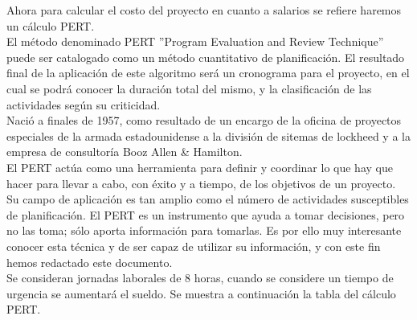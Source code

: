 \documentclass[12pt]{report}
\begin{document}
Ahora para calcular el costo del proyecto en cuanto a salarios se refiere haremos un cálculo PERT.\\
El método denominado PERT ''Program Evaluation and Review Technique'' puede ser catalogado como un método cuantitativo de planificación.
El resultado final de la aplicación de este algoritmo será un cronograma para el proyecto, en el cual se podrá conocer la duración total del mismo, y la clasificación de las actividades según su criticidad. \\
Nació a finales de 1957, como resultado de un encargo de la oficina de proyectos especiales de la armada estadounidense a la división de sitemas de lockheed y a la empresa de consultoría Booz Allen \& Hamilton.\\

El PERT actúa como una herramienta para definir y coordinar lo que hay que hacer para llevar a cabo, con éxito y a tiempo, de los objetivos de un proyecto. Su campo de aplicación es tan amplio como el número de actividades susceptibles de planificación.
El PERT es un instrumento que ayuda a tomar decisiones, pero no las toma; sólo aporta información para tomarlas. Es por ello muy interesante conocer esta técnica y de ser capaz de utilizar su información, y con este fin hemos redactado este documento.\cite{pert} \\
Se consideran jornadas laborales de 8 horas, cuando se considere un tiempo de urgencia se aumentará el sueldo. Se muestra a continuación la tabla del cálculo PERT.
\end{document}
